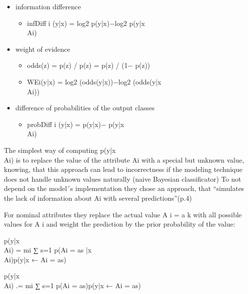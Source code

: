 \begin{itemize}
    \item information difference
        \begin{itemize}
                \item infDiff i (y|x) = log2 p(y|x)−log2 p(y|x\\Ai)
        \end{itemize}
    \item weight of evidence 
        \begin{itemize}
                \item odds(z) = p(z) / p(z) = p(z) / (1− p(z))
                \item WEi(y|x) = log2 (odds(y|x))−log2 (odds(y|x\\Ai))
        \end{itemize}
    \item difference of probabilities of the output classes
        \begin{itemize}
                \item probDiff i (y|x) = p(y|x)− p(y|x\\Ai)
        \end{itemize}
\end{itemize}
\par
The simplest way of computing p(y|x\\Ai) is to replace the value of the attribute Ai with a special but unknown value, knowing, that this approach can lead to incorrectness if the modeling technique does not handle unknown values naturally (naive Bayesian classificator)
To not depend on the model´s implementation they chose an approach, that “simulates the lack of information about Ai with several predictions”(p.4)
\par
For  nominal attributes they replace the actual value A i = a k with all possible values for A i and weight the prediction by the prior probability of the value: 
\begin{description}
    \item p(y|x\\Ai) = mi ∑ s=1 p(Ai = as |x\\Ai)p(y|x ← Ai = as) 
    \item p(y|x\\Ai) .= mi ∑ s=1 p(Ai = as)p(y|x ← Ai = as) 
\end{description}

